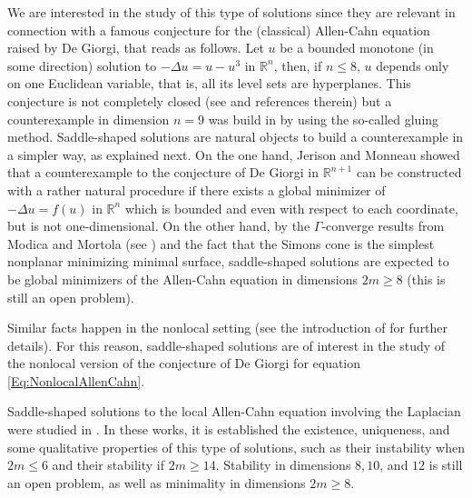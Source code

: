 \documentclass[12pt,reqno]{amsart}
\theoremstyle{definition}
\theoremstyle{remark}
\newcommand{\con}[1]{\mathbb{#1}}
\newcommand{\R}{\con{R}} %
\numberwithin{equation}{section}
\begin{document}
We are interested in the study of this type of solutions since they are relevant in connection with a famous conjecture for the (classical) Allen-Cahn equation raised by De Giorgi, that reads as follows. Let $u$ be a bounded monotone (in some direction) solution to $-\Delta u = u - u^3$ in $\R^n$, then, if $n \leq 8$, $u$ depends only on one Euclidean variable, that is, all its level sets are hyperplanes. This conjecture is not completely closed (see \cite{FarinaValdinoci-DeGiorgi} and references therein) but a counterexample in dimension $n=9$ was build in \cite{delPinoKowalczykWei} by using the so-called gluing method. Saddle-shaped solutions are natural objects to build a counterexample in a simpler way, as explained next. On the one hand, Jerison and Monneau \cite{JerisonMonneau} showed that a counterexample to the conjecture of De Giorgi in $\R^{n+1}$ can be constructed with a rather natural procedure if there exists a global minimizer of $-\Delta u = f(u)$ in $\R^n$ which is bounded and even with respect to each coordinate, but is not one-dimensional. On the other hand, by the $\Gamma$-converge results from Modica and Mortola (see \cite{Modica,ModicaMortola}) and the fact that the Simons cone is the simplest nonplanar minimizing minimal surface, saddle-shaped solutions are expected to be global minimizers of the Allen-Cahn equation in dimensions $2m\geq 8$ (this is still an open problem).

Similar facts happen in the nonlocal setting (see the introduction of \cite{Felipe-Sanz-Perela:SaddleFractional} for further details). For this reason, saddle-shaped solutions are of interest in the study of the nonlocal version of the conjecture of De Giorgi for equation \eqref{Eq:NonlocalAllenCahn}.

Saddle-shaped solutions to the local Allen-Cahn equation involving the Laplacian were studied in \cite{DangFifePeletier, Schatzman, CabreTerraI,CabreTerraII, Cabre-Saddle}. In these works, it is established the existence, uniqueness, and some qualitative properties of this type of solutions, such as their instability when $2m\leq 6$ and their stability if $2m\geq 14$. Stability in dimensions $8, 10$, and $12$ is still an open problem, as well as minimality in dimensions $2m\geq 8$.
\end{document}
